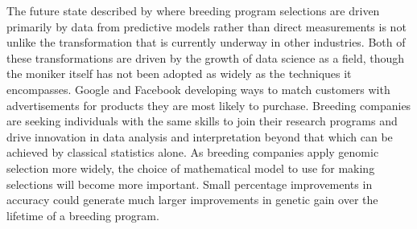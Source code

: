 The future state described by \citet{heffner2009} where breeding program
selections are driven primarily by data from predictive models rather than
direct measurements is not unlike the transformation that is currently
underway in other industries. Both of these transformations are driven by the 
growth of data science as a field, though the moniker itself has not
been adopted as widely as the techniques it encompasses.
Google and Facebook developing ways to match customers with advertisements for products they are 
most likely to purchase. Breeding companies are seeking individuals with the same skills to
join their research programs and drive innovation in data analysis and
interpretation beyond that which can be achieved by classical statistics
alone. As breeding companies apply genomic selection more widely, the choice of 
mathematical model to use for making selections will become more important. 
Small percentage improvements in accuracy could generate much larger
improvements in genetic gain over the lifetime of a breeding program.



